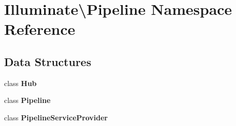 \section{Illuminate\textbackslash{}Pipeline Namespace Reference}
\label{namespace_illuminate_1_1_pipeline}
\subsection*{Data Structures}
\begin{DoxyCompactItemize}
\item 
class {\bf Hub}
\item 
class {\bf Pipeline}
\item 
class {\bf Pipeline\+Service\+Provider}
\end{DoxyCompactItemize}
